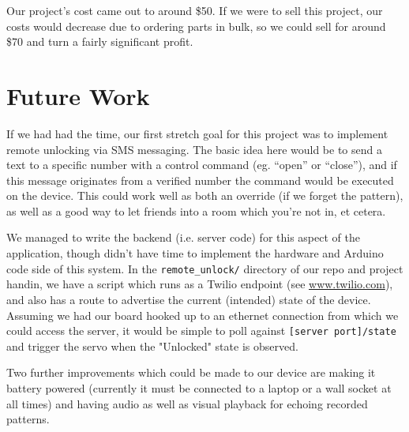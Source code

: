 \documentclass[11pt]{article}			%
\begin{document}
Our project's cost came out to around \$50. If we were to sell this project, our costs would decrease due to ordering parts in bulk, so we could sell for around \$70 and turn a fairly significant profit.

\section{Future Work}

If we had had the time, our first stretch goal for this project was to implement remote unlocking via SMS messaging. The basic idea here would be to send a text to a specific number with a control command (eg. ``open'' or ``close''), and if this message originates from a verified number the command would be executed on the device. This could work well as both an override (if we forget the pattern), as well as a good way to let friends into a room which you're not in, et cetera.

We managed to write the backend (i.e. server code) for this aspect of the application, though didn't have time to implement the hardware and Arduino code side of this system. In the \verb|remote_unlock/| directory of our repo and project handin, we have a script which runs as a Twilio endpoint (see \url{www.twilio.com}), and also has a route to advertise the current (intended) state of the device. Assuming we had our board hooked up to an ethernet connection from which we could access the server, it would be simple to poll against \verb|[server port]/state| and trigger the servo when the "Unlocked" state is observed.

Two further improvements which could be made to our device are making it battery powered (currently it must be connected to a laptop or a wall socket at all times) and having audio as well as visual playback for echoing recorded patterns.
\end{document}
